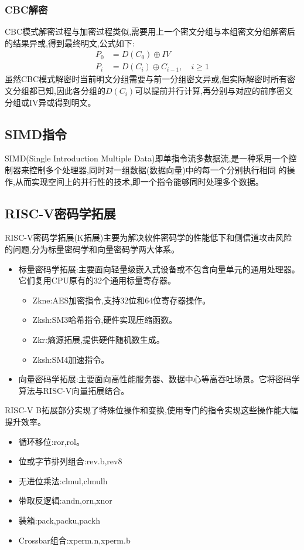 \subsubsection{CBC解密}
CBC模式解密过程与加密过程类似,需要用上一个密文分组与本组密文分组解密后的结果异或,得到最终明文,公式如下:
\[
\begin{aligned}
    P_0 &= D(C_0) \oplus IV \\
    P_i &= D(C_i) \oplus C_{i-1}, \quad i \geq 1
\end{aligned}
\]
虽然CBC模式解密时当前明文分组需要与前一分组密文异或,但实际解密时所有密文分组都已知,因此各分组的\(D(C_i)\)可以提前并行计算,再分别与对应的前序密文分组或IV异或得到明文。

\subsection{SIMD指令}
SIMD(Single Introduction Multiple Data)即单指令流多数据流,是一种采用一个控制器来控制多个处理器,同时对一组数据(数据向量)中的每一个分别执行相同
的操作,从而实现空间上的并行性的技术,即一个指令能够同时处理多个数据。



\subsection{RISC-V密码学拓展}
RISC-V密码学拓展(K拓展)主要为解决软件密码学的性能低下和侧信道攻击风险的问题,分为标量密码学和向量密码学两大体系。
\begin{itemize}
    \item [1.]标量密码学拓展:主要面向轻量级嵌入式设备或不包含向量单元的通用处理器。它们复用CPU原有的32个通用标量寄存器。
    \begin{itemize}
        \item Zkne:AES加密指令,支持32位和64位寄存器操作。
        \item Zksh:SM3哈希指令,硬件实现压缩函数。
        \item Zkr:熵源拓展,提供硬件随机数生成。
        \item Zksh:SM4加速指令。
    \end{itemize}
    \item [2.]向量密码学拓展:主要面向高性能服务器、数据中心等高吞吐场景。它将密码学算法与RISC-V向量拓展结合。
\end{itemize}
RISC-V B拓展部分实现了特殊位操作和变换,使用专门的指令实现这些操作能大幅提升效率。
\begin{itemize}
    \item 循环移位:ror,rol。
    \item 位或字节排列组合:rev.b,rev8
    \item 无进位乘法:clmul,clmulh
    \item 带取反逻辑:andn,orn,xnor
    \item 装箱:pack,packu,packh
    \item Crossbar组合:xperm.n,xperm.b
\end{itemize}


